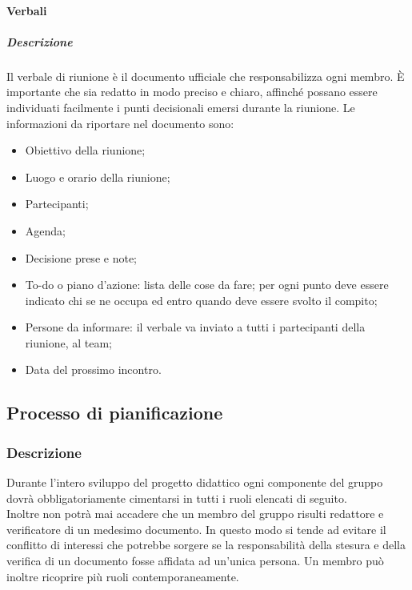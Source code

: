 \paragraph{Verbali}
\subparagraph{Descrizione}
Il verbale di riunione è il documento ufficiale che responsabilizza ogni membro.
È importante che sia redatto in modo preciso e chiaro, affinché possano essere individuati facilmente i punti decisionali emersi durante la riunione.
Le informazioni da riportare nel documento sono:
\begin{itemize}
\item
Obiettivo della riunione;
\item
Luogo e orario della riunione;
\item
Partecipanti;
\item
Agenda;
\item
Decisione prese e note;
\item
To-do o piano d’azione: lista delle cose da fare; per ogni punto deve essere indicato chi se ne occupa ed entro quando deve essere svolto il compito;
\item
Persone da informare: il verbale va inviato a tutti i partecipanti della riunione, al team;
\item
Data del prossimo incontro.
\end{itemize}

\subsection{Processo di pianificazione}

\subsubsection{Descrizione}
Durante l'intero sviluppo del progetto didattico ogni componente del gruppo 
dovrà obbligatoriamente cimentarsi in tutti i ruoli elencati di seguito. \\
Inoltre non potrà mai accadere che un membro del gruppo risulti redattore e verificatore di un medesimo documento. 
In questo modo si tende ad evitare il conflitto di interessi che potrebbe sorgere se la responsabilità della stesura 
e della verifica di un documento fosse affidata ad un'unica persona.
Un membro può inoltre ricoprire più ruoli contemporaneamente.

